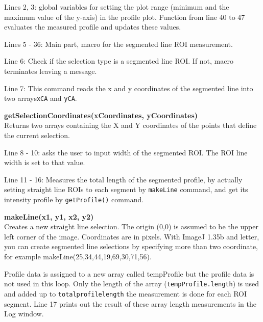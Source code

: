 \documentclass[11pt,a4paper,oneside]{report}
\newenvironment{indentCom}%
{\begin{list}{}%
         {\setlength{\leftmargin}{1em}}%
         \item[]%
}
{\end{list}}
\newcommand{\ilcom}[1]{\texttt{\small#1}}
\begin{document}
\begin{itemize}
\item Lines 2, 3: global variables for setting the plot range (minimum and the maximum value of the y-axis) in the profile plot. Function from line 40 to 47 evaluates the measured profile and updates these values. 

\item Lines 5 - 36: Main part, macro for the segmented line ROI measurement.  

\item Line 6: Check if the selection type is a segmented line ROI. If not, macro terminates leaving a message. 

\item Line 7: This command reads the x and y coordinates of the segmented line into two arrays\ilcom{xCA} and \ilcom{yCA}.

\begin{indentCom}
\textbf{getSelectionCoordinates(xCoordinates, yCoordinates)}\\
Returns two arrays containing the X and Y coordinates of the points that define the current selection. 
\end{indentCom}

\item Line 8 - 10: asks the user to input width of the segmented ROI. The ROI line width is set to that value. 

\item Line 11 - 16: Measures the total length of the segmented profile, by actually setting straight line ROIs to each segment by \ilcom{makeLine} command, and get its intensity profile by \ilcom{getProfile()} command.  

\begin{indentCom}
\textbf{makeLine(x1, y1, x2, y2)}\\
Creates a new straight line selection. The origin (0,0) is assumed to be the upper left corner of the image. Coordinates are in pixels. With ImageJ 1.35b and letter, you can create segmented line selections by specifying more than two coordinate, for example makeLine(25,34,44,19,69,30,71,56).
\end{indentCom}

\item Profile data is assigned to a new array called tempProfile but the profile data is not used in this loop. Only the length of the array (\ilcom{tempProfile.length}) is used and added up to \ilcom{totalprofilelength} the measurement is done for each ROI segment. Line 17 prints out the result of these array length measurements in the Log window. 


\end{itemize}
\end{document}
